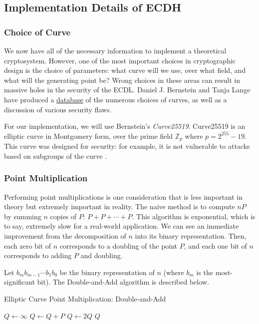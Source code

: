 \documentclass{article}
\begin{document}
\subsection{Implementation Details of ECDH}

\subsubsection{Choice of Curve}
We now have all of the necessary information to implement a theoretical cryptosystem.
However, one of the most important choices in cryptographic design is the choice of parameters: what curve will we use, over what field, and what will the generating point be?
Wrong choices in these areas can result in massive holes in the security of the ECDL.
Daniel J. Bernstein and Tanja Lange have produced a \href{http://safecurves.cr.yp.to/}{database} of the numerous choices of curves, as well as a discussion of various security flaws.

For our implementation, we will use Bernstein's \textit{Curve25519}.
Curve25519 is an elliptic curve in Montgomery form, over the prime field $\mathbb{Z}_p$ where $p = 2^{255} - 19$.
This curve was designed for security: for example, it is not vulnerable to attacks based on subgroups of the curve \cite{curve25519}.

\subsubsection{Point Multiplication}
Performing point multiplications is one consideration that is less important in theory but extremely important in reality.
The naive method is to compute $nP$ by summing $n$ copies of $P$: $P + P + \cdots + P$.
This algorithm is exponential, which is to say, extremely slow for a real-world application.
We can see an immediate improvement from the decomposition of $n$ into its binary representation.
Then, each zero bit of $n$ corresponds to a doubling of the point $P$, and each one bit of $n$ corresponds to adding $P$ and doubling.

Let $b_m b_{m-1} \cdots b_1 b_0$ be the binary representation of $n$ (where $b_m$ is the most-significant bit).
The Double-and-Add algorithm is described below.
\begin{algorithm}
\caption{Elliptic Curve Point Multiplication: Double-and-Add}
\begin{algorithmic}
\State $Q \gets \infty$
		\State $Q \gets Q + P$
	\EndIf
	\State $Q \gets 2Q$
\EndFor
\State \Return $Q$
\end{algorithmic}
\end{algorithm}
\end{document}
